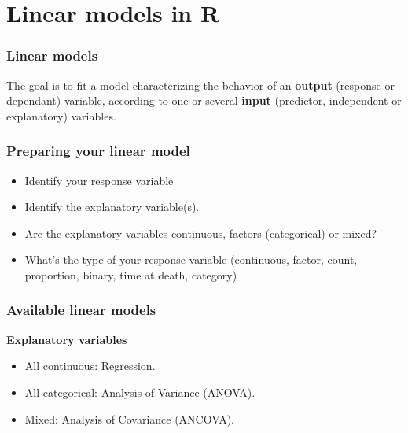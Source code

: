 
\section{Linear models in R}


\begin{frame}
\frametitle{Linear models}

The goal is to fit a model characterizing the behavior of an \textbf{output} (response or dependant)
variable, according to one or several \textbf{input} (predictor, independent or explanatory) variables.

\end{frame}


\begin{frame}
\frametitle{Preparing your linear model}

\begin{itemize}
  \item Identify your response variable
  \item Identify the explanatory variable(s).
  \item Are the explanatory variables continuous, factors (categorical) or mixed?
  \item What's the type of your response variable (continuous, factor, count, proportion, binary, time at death, category)
\end{itemize}

\end{frame}


\begin{frame}
\frametitle{Available linear models}
\textbf{Explanatory variables}
\begin{itemize}
\item All continuous: Regression.
\item All categorical: Analysis of Variance (ANOVA).
\item Mixed: Analysis of Covariance (ANCOVA).
\end{itemize}

\end{frame}

